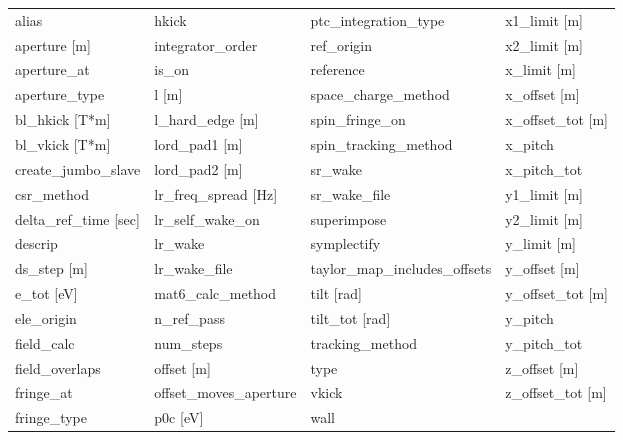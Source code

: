  \begin{tabular}{llll} \toprule
alias                          & hkick                          & ptc_integration_type           & x1_limit [m]                   \\
aperture [m]                   & integrator_order               & ref_origin                     & x2_limit [m]                   \\
aperture_at                    & is_on                          & reference                      & x_limit [m]                    \\
aperture_type                  & l [m]                          & space_charge_method            & x_offset [m]                   \\
bl_hkick [T*m]                 & l_hard_edge [m]                & spin_fringe_on                 & x_offset_tot [m]               \\
bl_vkick [T*m]                 & lord_pad1 [m]                  & spin_tracking_method           & x_pitch                        \\
create_jumbo_slave             & lord_pad2 [m]                  & sr_wake                        & x_pitch_tot                    \\
csr_method                     & lr_freq_spread [Hz]            & sr_wake_file                   & y1_limit [m]                   \\
delta_ref_time [sec]           & lr_self_wake_on                & superimpose                    & y2_limit [m]                   \\
descrip                        & lr_wake                        & symplectify                    & y_limit [m]                    \\
ds_step [m]                    & lr_wake_file                   & taylor_map_includes_offsets    & y_offset [m]                   \\
e_tot [eV]                     & mat6_calc_method               & tilt [rad]                     & y_offset_tot [m]               \\
ele_origin                     & n_ref_pass                     & tilt_tot [rad]                 & y_pitch                        \\
field_calc                     & num_steps                      & tracking_method                & y_pitch_tot                    \\
field_overlaps                 & offset [m]                     & type                           & z_offset [m]                   \\
fringe_at                      & offset_moves_aperture          & vkick                          & z_offset_tot [m]               \\
fringe_type                    & p0c [eV]                       & wall                           &                                \\
 \bottomrule
 \end{tabular}
 \vfill

